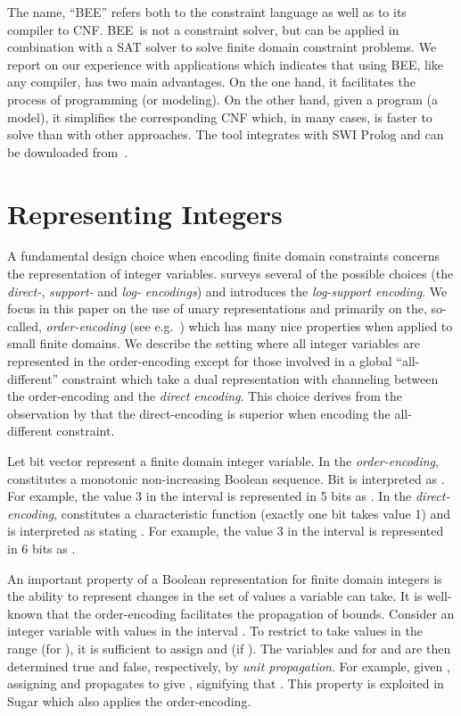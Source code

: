 \documentclass{tlp}
\newcommand{\bee}{\textsf{BEE}}
\begin{document}
The name, ``\bee'' refers both to the constraint language as well
as to its compiler to CNF. \bee\ is not a constraint solver, but can
be applied in combination with a SAT solver to solve finite domain
constraint problems.
We report on our experience with applications which indicates that
using \bee, like any compiler, has two main advantages. On the one
hand, it facilitates the process of programming (or modeling). On the
other hand, given a program (a model), it simplifies the corresponding
CNF which, in many cases, is faster to solve than with other
approaches.  The tool integrates with SWI Prolog and can be downloaded
from~\cite{bee2012}.


\section{Representing Integers}

A fundamental design choice when encoding finite domain constraints
concerns the representation of integer variables.
 surveys several of the possible
choices (the \emph{direct-}, \emph{support-} and \emph{log-}
\emph{encodings}) and introduces the \emph{log-support encoding}.
We focus in this paper on the use of unary representations and
primarily on the, so-called, \emph{order-encoding} (see
e.g.~\cite{baker,BailleuxB03}) which has many nice properties when
applied to small finite domains. We describe the setting where all
integer variables are represented in the order-encoding except for
those involved in a global ``all-different'' constraint which take a
dual representation with channeling between the order-encoding and the
\emph{direct encoding}. This choice derives from the observation by
 that the direct-encoding is superior when
encoding the all-different constraint.


Let bit vector  represent a finite domain integer
variable.  In the \emph{order-encoding},  constitutes a monotonic
non-increasing Boolean sequence. Bit  is interpreted as .  For example, the value 3 in the interval  is represented
in 5 bits as .  In the \emph{direct-encoding}, 
constitutes a characteristic function (exactly one bit takes value 1)
and  is interpreted as stating .  For example, the value
3 in the interval  is represented in 6 bits as .


An important property of a Boolean representation for finite domain
integers is the ability to represent changes in the set of values a
variable can take. 
It is well-known that the order-encoding facilitates the propagation
of bounds. Consider an integer variable  with
values in the interval .  To restrict  to take values in the
range  (for ), it is sufficient to assign
 and  (if ). The variables  and
 for  and  are then determined true
and false, respectively, by \emph{unit propagation}.  For example, 
given , assigning  and  propagates
to give , signifying that
.
This property is exploited in Sugar \cite{sugar2009} which also
applies the order-encoding.
\end{document}
